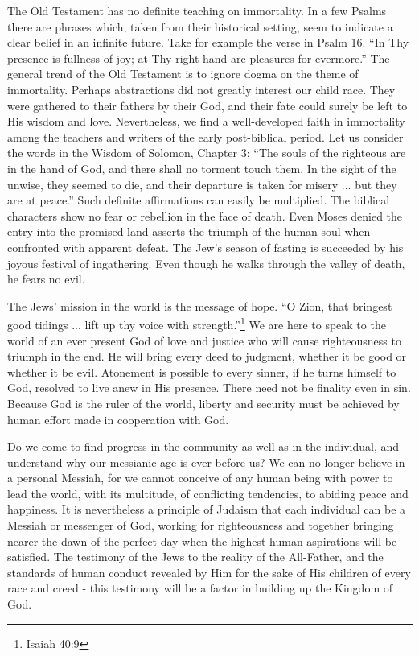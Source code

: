 The Old Testament has no definite teaching on immortality.
In a few Psalms there are phrases which, taken
from their historical setting, seem to indicate a clear
belief in an infinite future. Take for example the verse
in Psalm 16. ``In Thy presence is fullness of joy; at Thy
right hand are pleasures for evermore.'' The general trend
of the Old Testament is to ignore dogma on the theme of
immortality. Perhaps abstractions did not greatly interest
our child race. They were gathered to their fathers by
their God, and their fate could surely be left to His
wisdom and love. Nevertheless, we find a well-developed
faith in immortality among the teachers and writers of the
early post-biblical period. Let us consider the words in
the Wisdom of Solomon, Chapter 3: ``The souls of the
righteous are in the hand of God, and there shall no
torment touch them. In the sight of the unwise, they
seemed to die, and their departure is taken for misery
... but they are at peace.'' Such definite affirmations
can easily be multiplied. The biblical characters show no
fear or rebellion in the face of death. Even Moses denied
the entry into the promised land asserts the triumph of the
human soul when confronted with apparent defeat. The Jew's
season of fasting is succeeded by his joyous festival of
ingathering. Even though he walks through the valley of
death, he fears no evil.

The Jews' mission in the world is the message of hope.
``O Zion, that bringest good tidings ... lift up thy voice
with strength.''\footnote{Isaiah 40:9} We are here to speak to the world of an
ever present God of love and justice who will cause
righteousness to triumph in the end. He will bring every
deed to judgment, whether it be good or whether it be evil.
Atonement is possible to every sinner, if he turns himself
to God, resolved to live anew in His presence. There need
not be finality even in sin. Because God is the ruler of
the world, liberty and security must be achieved by human
effort made in cooperation with God.

Do we come to find progress in the community as well
as in the individual, and understand why our messianic age
is ever before us? We can no longer believe in a personal
Messiah, for we cannot conceive of any human being with
power to lead the world, with its multitude, of conflicting
tendencies, to abiding peace and happiness. It is nevertheless
a principle of Judaism that each individual can be
a Messiah or messenger of God, working for righteousness
and together bringing nearer the dawn of the perfect day
when the highest human aspirations will be satisfied. The
testimony of the Jews to the reality of the All-Father, and
the standards of human conduct revealed by Him for the sake
of His children of every race and creed - this testimony
will be a factor in building up the Kingdom of God.


